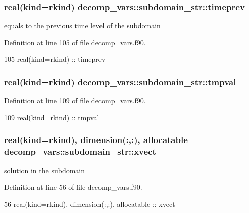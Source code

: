 \subsubsection[{timeprev}]{\setlength{\rightskip}{0pt plus 5cm}real(kind=rkind) decomp\+\_\+vars\+::subdomain\+\_\+str\+::timeprev}\label{structdecomp__vars_1_1subdomain__str_a7bbc9f79e06199c007a058abcb70695d}


equals to the previous time level of the subdomain 



Definition at line 105 of file decomp\+\_\+vars.\+f90.


\begin{DoxyCode}
105     \textcolor{keywordtype}{real(kind=rkind)} :: timeprev
\end{DoxyCode}
\subsubsection[{tmpval}]{\setlength{\rightskip}{0pt plus 5cm}real(kind=rkind) decomp\+\_\+vars\+::subdomain\+\_\+str\+::tmpval}\label{structdecomp__vars_1_1subdomain__str_a08a7b879b726daaefd0e257480f45044}


Definition at line 109 of file decomp\+\_\+vars.\+f90.


\begin{DoxyCode}
109     \textcolor{keywordtype}{real(kind=rkind)} :: tmpval
\end{DoxyCode}
\subsubsection[{xvect}]{\setlength{\rightskip}{0pt plus 5cm}real(kind=rkind), dimension(\+:,\+:), allocatable decomp\+\_\+vars\+::subdomain\+\_\+str\+::xvect}\label{structdecomp__vars_1_1subdomain__str_abdc721501cf9adb00b841d6ef63098ae}


solution in the subdomain 



Definition at line 56 of file decomp\+\_\+vars.\+f90.


\begin{DoxyCode}
56     \textcolor{keywordtype}{real(kind=rkind)}, \textcolor{keywordtype}{dimension(:,:)}, \textcolor{keywordtype}{allocatable} :: xvect
\end{DoxyCode}
